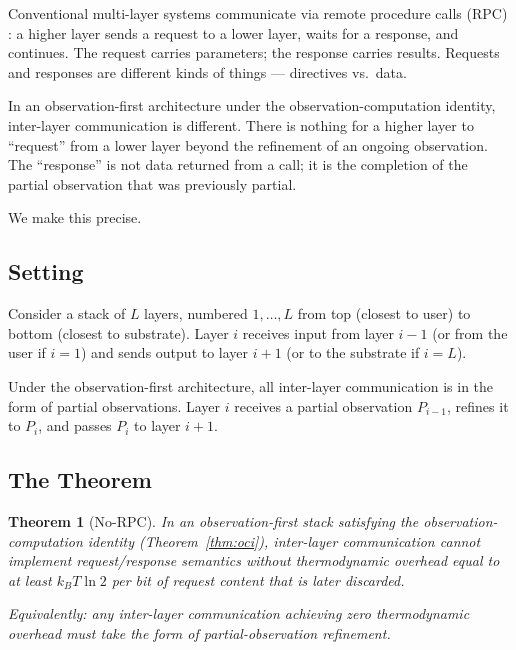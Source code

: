 \documentclass[11pt,twocolumn,a4paper]{article}
\newtheorem{theorem}{Theorem}[section]
\theoremstyle{definition}
\theoremstyle{remark}
\begin{document}
Conventional multi-layer systems communicate via remote procedure calls (RPC) \citep{birrell1984implementing}: a higher layer sends a request to a lower layer, waits for a response, and continues. The request carries parameters; the response carries results. Requests and responses are different kinds of things --- directives vs.\ data.

In an observation-first architecture under the observation-computation identity, inter-layer communication is different. There is nothing for a higher layer to ``request'' from a lower layer beyond the refinement of an ongoing observation. The ``response'' is not data returned from a call; it is the completion of the partial observation that was previously partial.

We make this precise.

\subsection{Setting}

Consider a stack of $L$ layers, numbered $1, \ldots, L$ from top (closest to user) to bottom (closest to substrate). Layer $i$ receives input from layer $i-1$ (or from the user if $i = 1$) and sends output to layer $i+1$ (or to the substrate if $i = L$).

Under the observation-first architecture, all inter-layer communication is in the form of partial observations. Layer $i$ receives a partial observation $P_{i-1}$, refines it to $P_i$, and passes $P_i$ to layer $i+1$.

\subsection{The Theorem}

\begin{theorem}[No-RPC]
\label{thm:norpc}
In an observation-first stack satisfying the observation-computation identity (Theorem~\ref{thm:oci}), inter-layer communication cannot implement request/response semantics without thermodynamic overhead equal to at least $k_B T \ln 2$ per bit of request content that is later discarded.

Equivalently: any inter-layer communication achieving zero thermodynamic overhead must take the form of partial-observation refinement.
\end{theorem}
\end{document}

